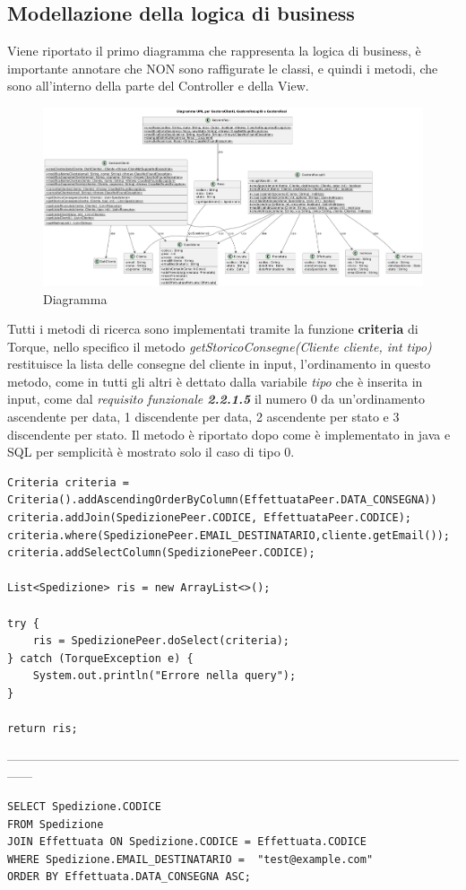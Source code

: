 \subsection{Modellazione della logica di business}
Viene riportato il primo diagramma che rappresenta la logica di business, è importante annotare che NON sono raffigurate le classi, e quindi i metodi, che sono all'interno della parte del Controller e della View.
\begin{figure}[H]
	\centering
	\includegraphics[width=\textwidth]{assets/logica_business.png}
	\caption{Diagramma}
\end{figure}

Tutti i metodi di ricerca sono implementati tramite la funzione \textbf{criteria} di Torque, nello specifico il metodo \textit{getStoricoConsegne(Cliente cliente, int tipo)} restituisce la lista delle consegne del cliente in input, l'ordinamento in questo metodo, come in tutti gli altri è dettato dalla variabile \textit{tipo} che è inserita in input, come dal \textit{requisito funzionale \textbf{2.2.1.5}} il numero 0 da un'ordinamento ascendente per data, 1 discendente per data, 2 ascendente per stato e 3 discendente per stato. Il metodo è riportato dopo come è implementato in java e SQL per semplicità è mostrato solo il caso di tipo 0.

\begin{verbatim}
Criteria criteria = Criteria().addAscendingOrderByColumn(EffettuataPeer.DATA_CONSEGNA))
criteria.addJoin(SpedizionePeer.CODICE, EffettuataPeer.CODICE);
criteria.where(SpedizionePeer.EMAIL_DESTINATARIO,cliente.getEmail());
criteria.addSelectColumn(SpedizionePeer.CODICE);

List<Spedizione> ris = new ArrayList<>();

try {
	ris = SpedizionePeer.doSelect(criteria);
} catch (TorqueException e) {
	System.out.println("Errore nella query");
}

return ris;
\end{verbatim}
------------------------------------------------------------------------------------------------------------------
\begin{verbatim}
SELECT Spedizione.CODICE
FROM Spedizione
JOIN Effettuata ON Spedizione.CODICE = Effettuata.CODICE
WHERE Spedizione.EMAIL_DESTINATARIO =  "test@example.com"
ORDER BY Effettuata.DATA_CONSEGNA ASC;
\end{verbatim}

